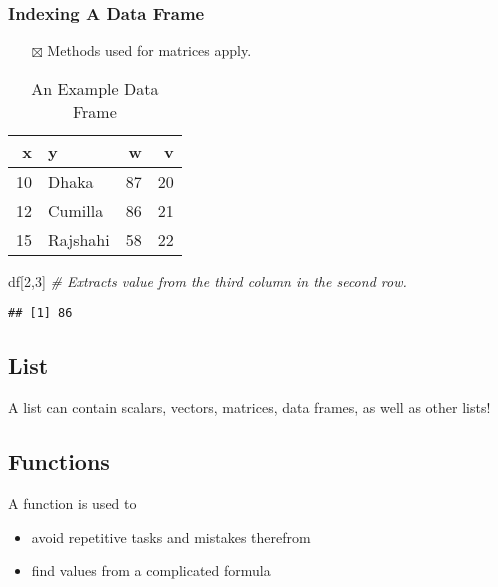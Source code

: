 \documentclass[
]{book}
\newenvironment{Shaded}{\begin{snugshade}}{\end{snugshade}}
\newcommand{\CommentTok}[1]{\textcolor[rgb]{0.56,0.35,0.01}{\textit{#1}}}
\newcommand{\DecValTok}[1]{\textcolor[rgb]{0.00,0.00,0.81}{#1}}
\newcommand{\NormalTok}[1]{#1}
\providecommand{\tightlist}{%
  \setlength{\itemsep}{0pt}\setlength{\parskip}{0pt}}
\begin{document}
\hypertarget{indexing-a-data-frame}{%
\subsubsection{Indexing A Data Frame}\label{indexing-a-data-frame}}

\begin{itemize}
\tightlist
\item[$\boxtimes$]
  Methods used for matrices apply.
\end{itemize}

\begin{table}

\caption{\label{tab:df}An Example Data Frame}
\centering
\begin{tabular}[t]{r|l|r|r}
\hline
x & y & w & v\\
\hline
10 & Dhaka & 87 & 20\\
\hline
12 & Cumilla & 86 & 21\\
\hline
15 & Rajshahi & 58 & 22\\
\hline
\end{tabular}
\end{table}

\begin{Shaded}
\begin{Highlighting}[]
\NormalTok{df[}\DecValTok{2}\NormalTok{,}\DecValTok{3}\NormalTok{] }\CommentTok{# Extracts value from the third column in the second row. }
\end{Highlighting}
\end{Shaded}

\begin{verbatim}
## [1] 86
\end{verbatim}

\hypertarget{list}{%
\subsection{List}\label{list}}

A list can contain scalars, vectors, matrices, data frames, as well as other lists!

\hypertarget{functions}{%
\subsection{Functions}\label{functions}}

A function is used to

\begin{itemize}
\tightlist
\item
  avoid repetitive tasks and mistakes therefrom
\item
  find values from a complicated formula
\end{itemize}
\end{document}
